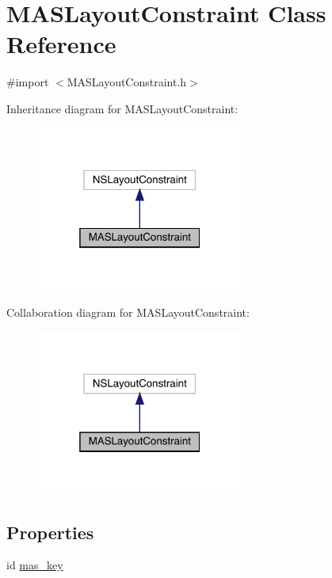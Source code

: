 \hypertarget{interface_m_a_s_layout_constraint}{}\section{M\+A\+S\+Layout\+Constraint Class Reference}
\label{interface_m_a_s_layout_constraint}


{\ttfamily \#import $<$M\+A\+S\+Layout\+Constraint.\+h$>$}



Inheritance diagram for M\+A\+S\+Layout\+Constraint\+:\nopagebreak
\begin{figure}[H]
\begin{center}
\leavevmode
\includegraphics[width=193pt]{interface_m_a_s_layout_constraint__inherit__graph}
\end{center}
\end{figure}


Collaboration diagram for M\+A\+S\+Layout\+Constraint\+:\nopagebreak
\begin{figure}[H]
\begin{center}
\leavevmode
\includegraphics[width=193pt]{interface_m_a_s_layout_constraint__coll__graph}
\end{center}
\end{figure}
\subsection*{Properties}
\begin{DoxyCompactItemize}
\item 
id \mbox{\hyperlink{interface_m_a_s_layout_constraint_a11b1c23ae0f604c661e4c86a9062fc19}{mas\+\_\+key}}
\end{DoxyCompactItemize}


